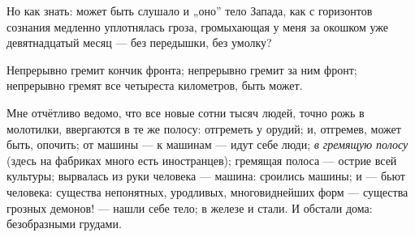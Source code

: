 \documentclass[12pt,a4paper,oneside]{book}
\begin{document}
Но как знать: может быть слушало и „оно” тело Запада, как с горизонтов сознания медленно уплотнялась гроза, громыхающая у меня за окошком уже девятнадцатый месяц — без передышки, без умолку?

Непрерывно гремит кончик фронта; непрерывно гремит за ним фронт; непрерывно гремят все четыреста километров, быть может.

Мне отчётливо ведомо, что все новые сотни тысяч людей, точно рожь в молотилки, ввергаются в те же полосу: отгреметь у орудий; и, отгремев, может быть, опочить; от машины — к машинам — идут себе люди; \emph{в гремящую полосу} (здесь на фабриках много есть иностранцев); гремящая полоса — острие всей культуры; вырвалась из руки человека — машина: сроились машины; и — бьют человека: существа непонятных, уродливых, многовиднейших форм — существа грозных демонов! — нашли себе тело; в железе и стали. И обстали дома: безобразными грудами.
\end{document}
